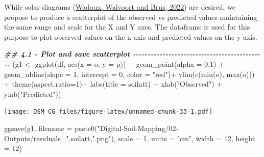 \documentclass[
  10pt,
  b5paper,
  oneside]{book}
\newenvironment{Shaded}{\begin{snugshade}}{\end{snugshade}}
\newcommand{\AttributeTok}[1]{\textcolor[rgb]{0.77,0.63,0.00}{#1}}
\newcommand{\DecValTok}[1]{\textcolor[rgb]{0.00,0.00,0.81}{#1}}
\newcommand{\DocumentationTok}[1]{\textcolor[rgb]{0.56,0.35,0.01}{\textbf{\textit{#1}}}}
\newcommand{\FloatTok}[1]{\textcolor[rgb]{0.00,0.00,0.81}{#1}}
\newcommand{\FunctionTok}[1]{\textcolor[rgb]{0.00,0.00,0.00}{#1}}
\newcommand{\NormalTok}[1]{#1}
\newcommand{\OtherTok}[1]{\textcolor[rgb]{0.56,0.35,0.01}{#1}}
\newcommand{\SpecialCharTok}[1]{\textcolor[rgb]{0.00,0.00,0.00}{#1}}
\newcommand{\StringTok}[1]{\textcolor[rgb]{0.31,0.60,0.02}{#1}}
\begin{document}
While solar diagrams (\protect\hyperlink{ref-Wadoux2022}{Wadoux, Walvoort and Brus, 2022}) are desired, we propose to produce a scatterplot of the observed vs predicted values maintaining the same range and scale for the X and Y axes. The dataframe is used for this purpose to plot observed values on the x-axis and predicted values on the y-axis.

\begin{Shaded}
\begin{Highlighting}[]
\DocumentationTok{\#\# 4.1 {-} Plot and save scatterplot {-}{-}{-}{-}{-}{-}{-}{-}{-}{-}{-}{-}{-}{-}{-}{-}{-}{-}{-}{-}{-}{-}{-}{-}{-}{-}{-}{-}{-}{-}{-}{-}{-}{-}{-}{-}{-}{-}{-}{-}{-}{-}{-}{-}{-} }
\NormalTok{(g1 }\OtherTok{\textless{}{-}} \FunctionTok{ggplot}\NormalTok{(df, }\FunctionTok{aes}\NormalTok{(}\AttributeTok{x =}\NormalTok{ o, }\AttributeTok{y =}\NormalTok{ p)) }\SpecialCharTok{+} 
  \FunctionTok{geom\_point}\NormalTok{(}\AttributeTok{alpha =} \FloatTok{0.1}\NormalTok{) }\SpecialCharTok{+} 
   \FunctionTok{geom\_abline}\NormalTok{(}\AttributeTok{slope =} \DecValTok{1}\NormalTok{, }\AttributeTok{intercept =} \DecValTok{0}\NormalTok{, }\AttributeTok{color =} \StringTok{"red"}\NormalTok{)}\SpecialCharTok{+}
  \FunctionTok{ylim}\NormalTok{(}\FunctionTok{c}\NormalTok{(}\FunctionTok{min}\NormalTok{(o), }\FunctionTok{max}\NormalTok{(o))) }\SpecialCharTok{+} \FunctionTok{theme}\NormalTok{(}\AttributeTok{aspect.ratio=}\DecValTok{1}\NormalTok{)}\SpecialCharTok{+} 
  \FunctionTok{labs}\NormalTok{(}\AttributeTok{title =}\NormalTok{ soilatt) }\SpecialCharTok{+} 
  \FunctionTok{xlab}\NormalTok{(}\StringTok{"Observed"}\NormalTok{) }\SpecialCharTok{+} \FunctionTok{ylab}\NormalTok{(}\StringTok{"Predicted"}\NormalTok{))}
\end{Highlighting}
\end{Shaded}

\texttt{[image: DSM\_CG\_files/figure-latex/unnamed-chunk-33-1.pdf]}

\begin{Shaded}
\begin{Highlighting}[]
\FunctionTok{ggsave}\NormalTok{(g1, }\AttributeTok{filename =} \FunctionTok{paste0}\NormalTok{(}\StringTok{"Digital{-}Soil{-}Mapping/02{-}Outputs/residuals\_"}\NormalTok{,soilatt,}\StringTok{".png"}\NormalTok{), }\AttributeTok{scale =} \DecValTok{1}\NormalTok{, }
       \AttributeTok{units =} \StringTok{"cm"}\NormalTok{, }\AttributeTok{width =} \DecValTok{12}\NormalTok{, }\AttributeTok{height =} \DecValTok{12}\NormalTok{)}
\end{Highlighting}
\end{Shaded}
\end{document}
